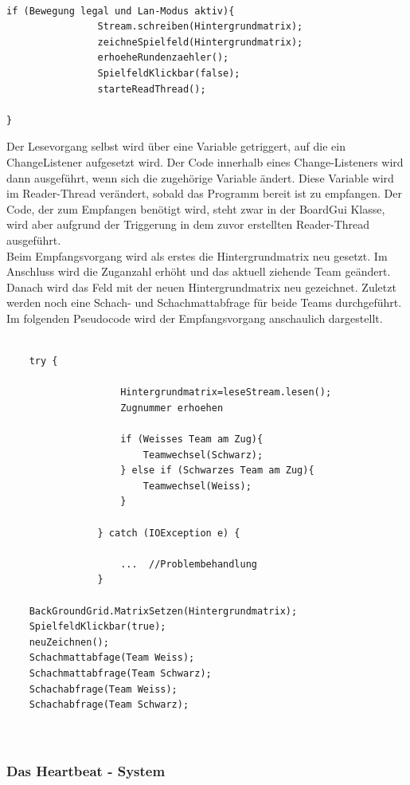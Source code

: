 \documentclass[12pt,a4paper]{article}
\begin{document}
\lstset{language=java}
\begin{lstlisting}

if (Bewegung legal und Lan-Modus aktiv){
				Stream.schreiben(Hintergrundmatrix);
				zeichneSpielfeld(Hintergrundmatrix);
				erhoeheRundenzaehler();
				SpielfeldKlickbar(false);
				starteReadThread();
				
}
\end{lstlisting}
Der Lesevorgang selbst wird über eine Variable getriggert, auf die ein ChangeListener aufgesetzt wird. Der Code innerhalb eines Change-Listeners wird dann ausgeführt, wenn sich die zugehörige Variable ändert. Diese Variable wird im Reader-Thread verändert, sobald das Programm bereit ist zu empfangen.
Der Code, der zum Empfangen benötigt wird, steht zwar in der BoardGui Klasse, wird aber aufgrund der Triggerung in dem zuvor erstellten Reader-Thread ausgeführt.\\[2ex]
Beim Empfangsvorgang wird als erstes die Hintergrundmatrix neu gesetzt. Im Anschluss wird die Zuganzahl erhöht und das aktuell ziehende Team geändert.
Danach wird das Feld mit der neuen Hintergrundmatrix neu gezeichnet. Zuletzt werden noch eine Schach- und Schachmattabfrage für beide Teams durchgeführt.\\[2ex]
Im folgenden Pseudocode wird der Empfangsvorgang anschaulich dargestellt.

\lstset{language=java}
\begin{lstlisting}

	try {

					Hintergrundmatrix=leseStream.lesen();
					Zugnummer erhoehen
					
					if (Weisses Team am Zug){
						Teamwechsel(Schwarz);
					} else if (Schwarzes Team am Zug){
						Teamwechsel(Weiss);
					}

				} catch (IOException e) {
					
					...  //Problembehandlung
				}

	BackGroundGrid.MatrixSetzen(Hintergrundmatrix);
	SpielfeldKlickbar(true);
	neuZeichnen();
	Schachmattabfage(Team Weiss);
	Schachmattabfrage(Team Schwarz);
	Schachabfrage(Team Weiss);
	Schachabfrage(Team Schwarz);
	


\end{lstlisting}


\subsubsection{Das Heartbeat - System}
\label{SUBSUBSEC:HEARTBEAT}
\end{document}
